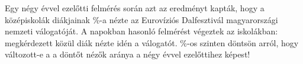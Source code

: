 Egy négy évvel ezelőtti felmérés során azt az eredményt kapták, hogy a 
középiskolák diákjainak \%-a nézte az Eurovíziós Dalfesztivál 
magyarországi nemzeti válogatóját. A napokban hasonló felmérést végeztek 
az iskolákban:  megkérdezett közül  diák nézte idén a 
válogatót. \%-os szinten döntsön arról, hogy változott-e a 
a döntőt nézők aránya a négy évvel ezelőttihez képest!

